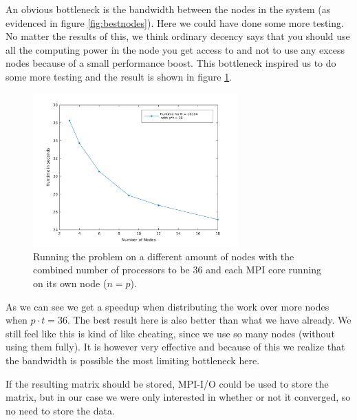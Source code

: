 An obvious bottleneck is the bandwidth between the nodes in the system (as evidenced in figure \ref{fig:bestnodes}). Here we could have done some more testing. No matter the results of this, we think ordinary decency says that you should use all the computing power in the node you get access to and not to use any excess nodes because of a small performance boost. This bottleneck inspired us to do some more testing and the result is shown in figure \ref{fig:varynodes}.
\begin{figure}[h]
\centering
\includegraphics[width=0.7\textwidth]{./figures/varynodes}
\caption{Running the problem on a different amount of nodes with the combined number of processors to be 36 and each MPI core running on its own node ($n=p$).}
\label{fig:varynodes}
\end{figure}
As we can see we get a speedup when distributing the work over more nodes when $p\cdot t=36$. The best result here is also better than what we have already. We still feel like this is kind of like cheating, since we use so many nodes (without using them fully). It is however very effective and because of this we realize that the bandwidth is possible the most limiting bottleneck here.

If the resulting matrix should be stored, MPI-I/O could be used to store the matrix, but in our case we were only interested in whether or not it converged, so no need to store the data.
